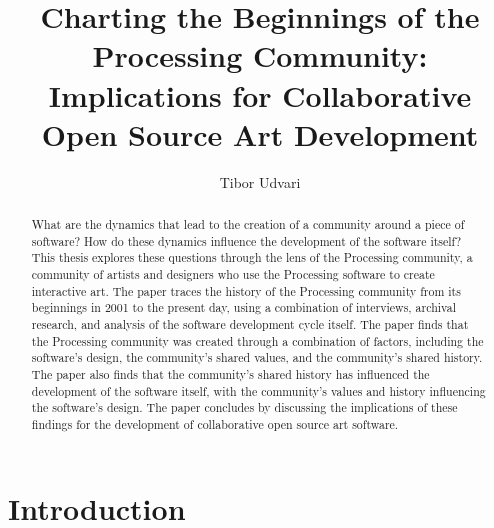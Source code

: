 \documentclass{memoir}
\title{Charting the Beginnings of the Processing Community: Implications for Collaborative Open Source Art Development}
\author{Tibor Udvari}
\begin{document}
\maketitle

\begin{abstract}
What are the dynamics that lead to the creation of a community around a piece of software? How do these dynamics influence the development of the software itself? This thesis explores these questions through the lens of the Processing community, a community of artists and designers who use the Processing software to create interactive art. The paper traces the history of the Processing community from its beginnings in 2001 to the present day, using a combination of interviews, archival research, and analysis of the software development cycle itself. The paper finds that the Processing community was created through a combination of factors, including the software's design, the community's shared values, and the community's shared history. The paper also finds that the community's shared history has influenced the development of the software itself, with the community's values and history influencing the software's design. The paper concludes by discussing the implications of these findings for the development of collaborative open source art software.
\end{abstract}


\section{Introduction}

\end{document}
